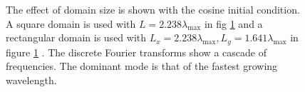 \documentclass[a4paper,12pt]{article}
\begin{document}
  \begin{figure} 
   \centering
   \caption{The effect of domain size is shown with the cosine initial condition. A square domain is used with $L=2.238\lambda_\text{max}$ in fig \ref{fig_domain_size_effect}  and a rectangular domain is used with $L_x = 2.238 \lambda_\text{max}, L_y=1.641 \lambda_\text{max}$ in figure \ref{fig_domain_size_effect} . The discrete Fourier transforms show a cascade of frequencies. The dominant mode is that of the fastest growing wavelength.}
   \label{fig_domain_size_effect}
  \end{figure}



\end{document}
